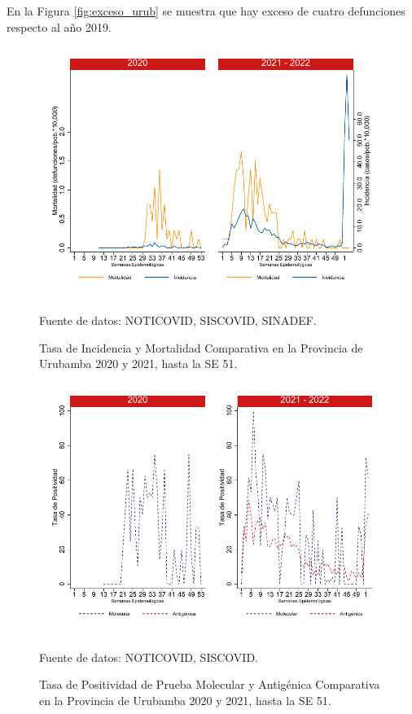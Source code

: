 \documentclass[12pt,a4paper,openany]{book}
\begin{document}
		En la Figura \ref{fig:exceso_urub} se muestra que hay exceso de cuatro defunciones respecto al año 2019.
		
		\begin{figure}[h]
			\caption{Tasa de Incidencia y Mortalidad Comparativa en la Provincia de Urubamba 2020 y 2021, hasta la SE 51.}\label{fig:inc_urub}
			\begin{center}
				\includegraphics[width=0.7\linewidth]{../figuras/incidencia_mortalidad_20_21_13}
			\end{center}
			{\footnotesize {Fuente de datos: NOTICOVID, SISCOVID, SINADEF.}}
		\end{figure}
		
		\begin{figure}[h]
			\caption{Tasa de Positividad de Prueba Molecular y Antigénica Comparativa en la Provincia de Urubamba 2020 y 2021, hasta la SE 51.}\label{fig:positividad_urub}
			\begin{center}
				\includegraphics[width=0.7\linewidth]{../figuras/positividad_20_21_13}
			\end{center}
			{\footnotesize {Fuente de datos: NOTICOVID, SISCOVID.}}
		\end{figure}
		
\end{document}
